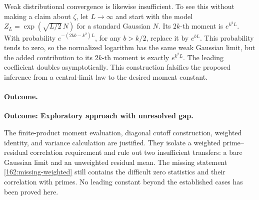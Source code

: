 \documentclass[11pt,a4paper]{article}
\numberwithin{equation}{section}
\begin{document}
Weak distributional convergence is likewise insufficient. To see this
without making a claim about $\zeta$, let $L\to\infty$ and start with the
model $Z_L=\exp(\sqrt{L/2}\,N)$ for a standard Gaussian $N$.
Its $2k$-th moment is $e^{k^2L}$. With probability
$e^{-(2kb-k^2)L}$, for any $b>k/2$, replace it by $e^{bL}$.
This probability tends to zero, so the normalized logarithm has the same
weak Gaussian limit, but the added contribution to its $2k$-th moment
is exactly $e^{k^2L}$. The leading coefficient doubles asymptotically.
This construction falsifies the proposed inference from a central-limit
law to the desired moment constant.

\paragraph{Outcome.}
\textbf{Outcome: Exploratory approach with unresolved gap.}

The finite-product moment evaluation, diagonal cutoff construction,
weighted identity, and variance calculation are justified. They isolate
a weighted prime--residual correlation requirement and rule out two
insufficient transfers: a bare Gaussian limit and an unweighted residual
mean. The missing statement \eqref{162:missing-weighted} still contains
the difficult zero statistics and their correlation with primes. No
leading constant beyond the established cases has been proved here.
\end{document}
